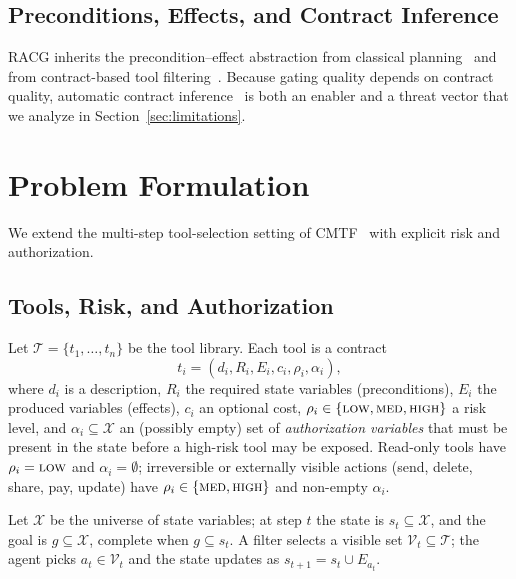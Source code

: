 \documentclass[conference,onecolumn]{IEEEtran}
\begin{document}
\subsection{Preconditions, Effects, and Contract Inference}
RACG inherits the precondition--effect abstraction from classical planning~\cite{fikes1971strips,mcdermott1998pddl} and from contract-based tool filtering~\cite{anon2026cmtf}. Because gating quality depends on contract quality, automatic contract inference~\cite{contract2tool2026} is both an enabler and a threat vector that we analyze in Section~\ref{sec:limitations}.

\section{Problem Formulation}
\label{sec:problem}
We extend the multi-step tool-selection setting of CMTF~\cite{anon2026cmtf} with explicit risk and authorization.

\subsection{Tools, Risk, and Authorization}
Let $\mathcal{T}=\{t_1,\dots,t_n\}$ be the tool library. Each tool is a contract
\begin{equation}
t_i = (d_i, R_i, E_i, c_i, \rho_i, \alpha_i),
\end{equation}
where $d_i$ is a description, $R_i$ the required state variables (preconditions), $E_i$ the produced variables (effects), $c_i$ an optional cost, $\rho_i \in \{\textsc{low},\textsc{med},\textsc{high}\}$ a risk level, and $\alpha_i \subseteq \mathcal{X}$ an (possibly empty) set of \emph{authorization variables} that must be present in the state before a high-risk tool may be exposed. Read-only tools have $\rho_i=\textsc{low}$ and $\alpha_i=\emptyset$; irreversible or externally visible actions (send, delete, share, pay, update) have $\rho_i \in \{\textsc{med},\textsc{high}\}$ and non-empty $\alpha_i$.

Let $\mathcal{X}$ be the universe of state variables; at step $t$ the state is $s_t \subseteq \mathcal{X}$, and the goal is $g \subseteq \mathcal{X}$, complete when $g \subseteq s_t$. A filter selects a visible set $\mathcal{V}_t \subseteq \mathcal{T}$; the agent picks $a_t \in \mathcal{V}_t$ and the state updates as $s_{t+1} = s_t \cup E_{a_t}$.
\end{document}
